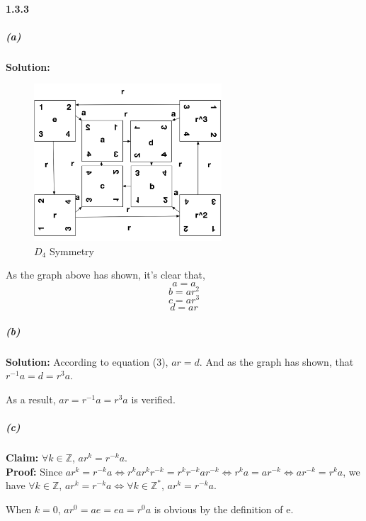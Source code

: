 \documentclass[11pt]{report}
\begin{document}
\paragraph{1.3.3}
    \subparagraph{(a)}
        \textbf{Solution:} 
        \begin{figure}[H]
        \begin{center}
        \includegraphics[width=7cm]{./imgs/square_symmetry.png}
        \caption{$D_4$ Symmetry}
        \end{center}
    \end{figure}
    As the graph above has shown, it's clear that,
        \begin{equation} a = a \end{equation}
        \begin{equation} b = ar^2
\end{equation}
        \begin{equation} c = ar^3
\end{equation}
        \begin{equation} d = ar
\end{equation}

    \subparagraph{(b)}
    \textbf{Solution:} According to equation (3), $ar = d$. And as the graph has shown, that $r^{-1}a = d = r^3a$. 
    
    As a result, $ar = r^{-1}a = r^3a$ is verified.
    \subparagraph{(c)} \textbf{Claim:} $\forall k \in \mathbb{Z}$, $ar^k = r^{-k}a$.\\
    
    \textbf{Proof:} Since $ar^k = r^{-k}a \Leftrightarrow r^kar^kr^{-k} = r^kr^{-k}ar^{-k} \Leftrightarrow r^ka = ar^{-k} \Leftrightarrow ar^{-k} = r^ka$, we have $\forall k \in \mathbb{Z}$, $ar^k = r^{-k}a \Leftrightarrow \forall k \in \mathbb{Z}^*$, $ar^k = r^{-k}a$.
    
    When $k = 0$, $ar^0 = ae = ea = r^0a$ is obvious by the definition of e. 
    
\end{document}
